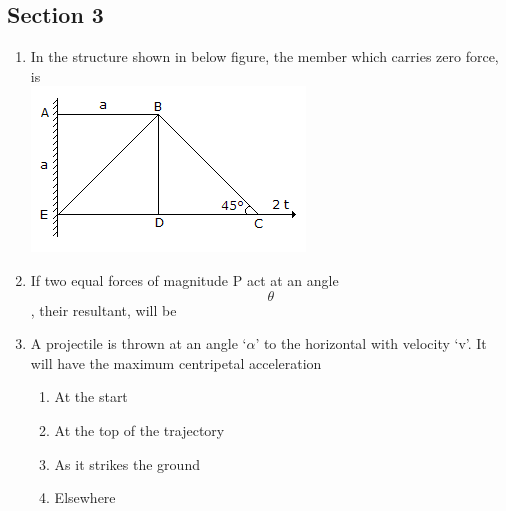 \documentclass[11pt,a4paper]{article}
\begin{document}
\subsection*{Section 3}
\begin{enumerate}
\item{In the structure shown in below figure, the member which carries zero force, is \\

\includegraphics{../data_img/applied-mechanics-and-graphic-statics_1525413392-7.png}
}
\\
\item{If two equal forces of magnitude P act at an angle $$\theta $$, their resultant, will be
}
\\
\item{A projectile is thrown at an angle `$\alpha$' to the horizontal with velocity `v'. It will have the maximum centripetal acceleration
}
\begin{enumerate}[label=\Alph*.]
\item{At the start}
\item{At the top of the trajectory}
\item{As it strikes the ground}
\item{Elsewhere}
\end{enumerate}

\end{enumerate}
\end{document}
